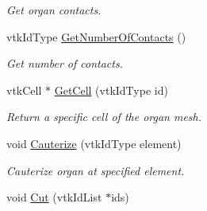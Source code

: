 \begin{DoxyCompactItemize}
\begin{DoxyCompactList}\small\item\em Get organ contacts. \item\end{DoxyCompactList}\item 
\hypertarget{classvtkOrgan_a6ed2441ed7ccc63a4c7a427f85d35e43}{
vtkIdType \hyperlink{classvtkOrgan_a6ed2441ed7ccc63a4c7a427f85d35e43}{GetNumberOfContacts} ()}
\label{classvtkOrgan_a6ed2441ed7ccc63a4c7a427f85d35e43}

\begin{DoxyCompactList}\small\item\em Get number of contacts. \item\end{DoxyCompactList}\item 
vtkCell $\ast$ \hyperlink{classvtkOrgan_a715bbd46dbfc1838b2d76135126ac59c}{GetCell} (vtkIdType id)
\begin{DoxyCompactList}\small\item\em Return a specific cell of the organ mesh. \item\end{DoxyCompactList}\item 
\hypertarget{classvtkOrgan_abdf5d83015e2f3bef9d70ef04f24c386}{
void \hyperlink{classvtkOrgan_abdf5d83015e2f3bef9d70ef04f24c386}{Cauterize} (vtkIdType element)}
\label{classvtkOrgan_abdf5d83015e2f3bef9d70ef04f24c386}

\begin{DoxyCompactList}\small\item\em Cauterize organ at specified element. \item\end{DoxyCompactList}\item 
\hypertarget{classvtkOrgan_a75fe999df93bb2594d64d25f6b211de4}{
void \hyperlink{classvtkOrgan_a75fe999df93bb2594d64d25f6b211de4}{Cut} (vtkIdList $\ast$ids)}
\label{classvtkOrgan_a75fe999df93bb2594d64d25f6b211de4}


\end{DoxyCompactItemize}
